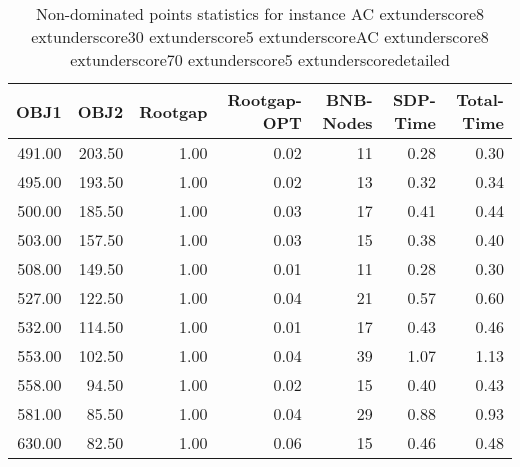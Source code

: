\begin{table}
\caption{Non-dominated points statistics for instance AC	extunderscore8	extunderscore30	extunderscore5	extunderscoreAC	extunderscore8	extunderscore70	extunderscore5	extunderscoredetailed}
\label{tab:plots/AC_8_30_5_AC_8_70_5_detailed}
\begin{tabular}{rrrrrrr}
\toprule
OBJ1 & OBJ2 & Rootgap & Rootgap-OPT & BNB-Nodes & SDP-Time & Total-Time \\
\midrule
491.00 & 203.50 & 1.00 & 0.02 & 11 & 0.28 & 0.30 \\
495.00 & 193.50 & 1.00 & 0.02 & 13 & 0.32 & 0.34 \\
500.00 & 185.50 & 1.00 & 0.03 & 17 & 0.41 & 0.44 \\
503.00 & 157.50 & 1.00 & 0.03 & 15 & 0.38 & 0.40 \\
508.00 & 149.50 & 1.00 & 0.01 & 11 & 0.28 & 0.30 \\
527.00 & 122.50 & 1.00 & 0.04 & 21 & 0.57 & 0.60 \\
532.00 & 114.50 & 1.00 & 0.01 & 17 & 0.43 & 0.46 \\
553.00 & 102.50 & 1.00 & 0.04 & 39 & 1.07 & 1.13 \\
558.00 & 94.50 & 1.00 & 0.02 & 15 & 0.40 & 0.43 \\
581.00 & 85.50 & 1.00 & 0.04 & 29 & 0.88 & 0.93 \\
630.00 & 82.50 & 1.00 & 0.06 & 15 & 0.46 & 0.48 \\
\bottomrule
\end{tabular}
\end{table}

